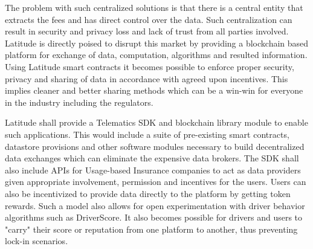 The problem with such centralized solutions is that there is a central entity that extracts the fees and has direct
control over the data. Such centralization can result in security and privacy loss and lack of trust from all parties
involved. Latitude is directly poised to disrupt this market by providing a blockchain based platform for exchange of
data, computation, algorithms and resulted information. Using Latitude smart contracts it becomes possible to enforce
proper security, privacy and sharing of data in accordance with agreed upon incentives. This implies cleaner and better
sharing methods which can be a win-win for everyone in the industry including the regulators.

Latitude shall provide a Telematics SDK and blockchain library module to enable such applications. This would include a
suite of pre-existing smart contracts, datastore provisions and other software modules necessary to build decentralized
data exchanges which can eliminate the expensive data brokers. The SDK shall also include APIs for Usage-based Insurance
companies to act as data providers given appropriate involvement, permission and incentives for the users. Users can
also be incentivized to provide data directly to the platform by getting token rewards. Such a model also allows for
open experimentation with driver behavior algorithms such as DriverScore. It also becomes possible for drivers and users
to "carry" their score or reputation from one platform to another, thus preventing lock-in scenarios.

